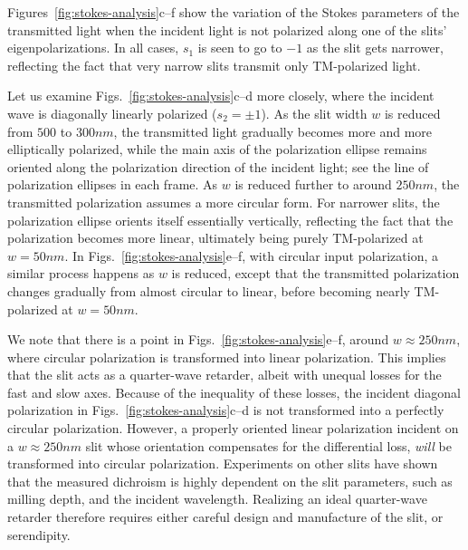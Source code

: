 Figures~\ref{fig:stokes-analysis}c--f show the variation of the Stokes parameters of the transmitted light when the incident light is not polarized along one of the slits' eigenpolarizations.
In all cases, $s_1$ is seen to go to $-1$ as the slit gets narrower, reflecting the fact that very narrow slits transmit only \gls{TM}-polarized light.

Let us examine Figs.~\ref{fig:stokes-analysis}c--d more closely, where the incident wave is diagonally linearly polarized ($s_2=\pm 1$).
As the slit width $w$ is reduced from $500$ to $300\unit{nm}$, the transmitted light gradually becomes more and more elliptically polarized, while the main axis of the polarization ellipse remains oriented along the polarization direction of the incident light; see the line of polarization ellipses in each frame.
As $w$ is reduced further to around $250\unit{nm}$, the transmitted polarization assumes a more circular form.
For narrower slits, the polarization ellipse orients itself essentially vertically, reflecting the fact that the polarization becomes more linear, ultimately being purely \gls{TM}-polarized at $w=50\unit{nm}$.
In Figs.~\ref{fig:stokes-analysis}e--f, with circular input polarization, a similar process happens as $w$ is reduced, except that the transmitted polarization changes gradually from almost circular to linear, before becoming nearly \gls{TM}-polarized at $w=50\unit{nm}$.

We note that there is a point in Figs.~\ref{fig:stokes-analysis}e--f, around $w\approx 250\unit{nm}$, where circular polarization is transformed into linear polarization.
This implies that the slit acts as a quarter-wave retarder, albeit with unequal losses for the fast and slow axes.
Because of the inequality of these losses, the incident diagonal polarization in Figs.~\ref{fig:stokes-analysis}c--d is not transformed into a perfectly circular polarization.
However, a properly oriented linear polarization incident on a $w\approx 250\unit{nm}$ slit whose orientation compensates for the differential loss, \emph{will} be transformed into circular polarization.
Experiments on other slits have shown that the measured dichroism is highly dependent on the slit parameters, such as milling depth\cite[13]{BosmanBachelorsThesis}, and the incident wavelength.\cite[30]{BogersBachelorsThesis}
Realizing an ideal quarter-wave retarder therefore requires either careful design and manufacture of the slit, or serendipity.

